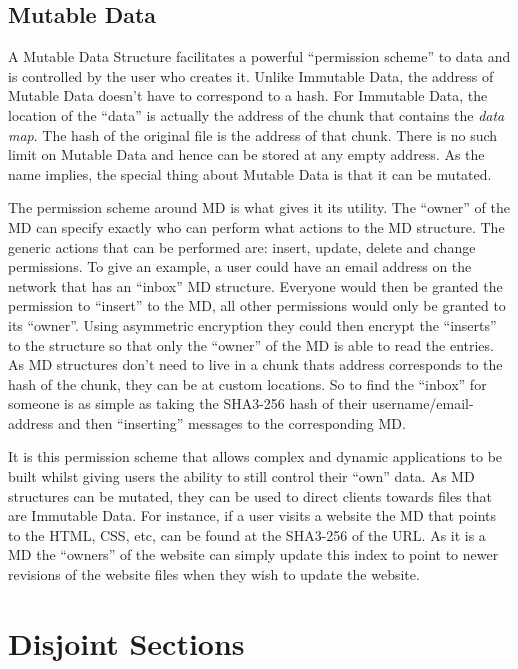 \subsection{Mutable Data}

A Mutable Data Structure facilitates a powerful ``permission scheme'' to data and is controlled by the user who creates it. Unlike Immutable Data, the address of Mutable Data doesn't have to correspond to a hash. For Immutable Data, the location of the ``data'' is actually the address of the chunk that contains the \textit{data map}. The hash of the original file is the address of that chunk. There is no such limit on Mutable Data and hence can be stored at any empty address. As the name implies, the special thing about Mutable Data is that it can be mutated.

The permission scheme around MD is what gives it its utility. The ``owner'' of the MD can specify exactly who can perform what actions to the MD structure. The generic actions that can be performed are: insert, update, delete and change permissions. To give an example, a user could have an email address on the network that has an ``inbox'' MD structure. Everyone would then be granted the permission to ``insert'' to the MD, all other permissions would only be granted to its ``owner''. Using asymmetric encryption they could then encrypt the ``inserts'' to the structure so that only the ``owner'' of the MD is able to read the entries. As MD structures don't need to live in a chunk thats address corresponds to the hash of the chunk, they can be at custom locations. So to find the ``inbox'' for someone is as simple as taking the SHA3-256 hash of their username/email-address and then ``inserting'' messages to the corresponding MD.

It is this permission scheme that allows complex and dynamic applications to be built whilst giving users the ability to still control their ``own'' data.  As MD structures can be mutated, they can be used to direct clients towards files that are Immutable Data. For instance, if a user visits a website the MD that points to the HTML, CSS, etc, can be found at the SHA3-256 of the URL. As it is a MD the ``owners'' of the website can simply update this index to point to newer revisions of the website files when they wish to update the website.

\section{Disjoint Sections}

